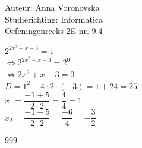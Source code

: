 \documentclass[a4paper]{article}
\begin{document}
  
\noindent \large Auteur: Anna Voronovska \\
\noindent \large Studierichting: Informatica\\
\noindent \large Oefeningenreeks 2E nr. 9.4\\

\medskip

\normalsize

$2^{2x^2+x-3} = 1$ \\

$\Leftrightarrow 2^{2x^2+x-3} = 2^0$ \\

$\Leftrightarrow 2x^2+x-3 = 0$ \\

$D = 1^2 - 4 \cdot 2 \cdot (-3) = 1 + 24 = 25$ \\

$x_1 = \dfrac{-1+5}{2 \cdot 2} = \dfrac{4}{4} = 1$ \\

$x_2 = \dfrac{-1-5}{2 \cdot 2} = \dfrac{-6}{4} = -\dfrac{3}{2}$\\


\begin{thebibliography}{999}
\end{thebibliography}
\end{document}

